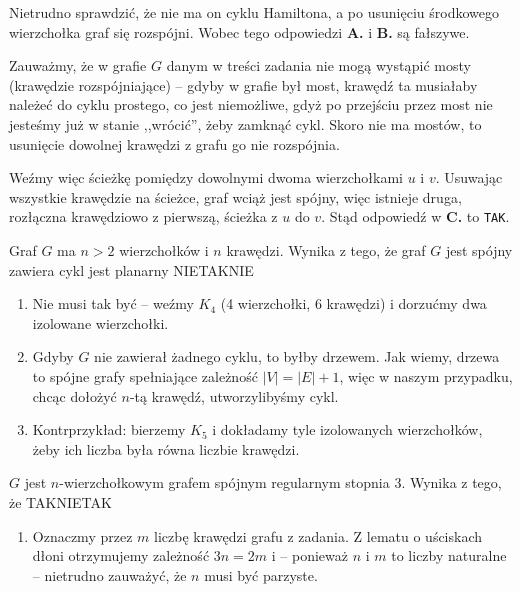 \begin{solutions}
\begin{center}
    \end{center}
    
    Nietrudno sprawdzić, że nie ma on cyklu Hamiltona, a po usunięciu środkowego wierzchołka graf się rozspójni. Wobec tego odpowiedzi \textbf{A.} i \textbf{B.} są fałszywe. 
    
    Zauważmy, że w grafie $G$ danym w treści zadania nie mogą wystąpić mosty (krawędzie rozspójniające) -- gdyby w grafie był most, krawędź ta musiałaby należeć do cyklu prostego, co jest niemożliwe, gdyż po przejściu przez most nie jesteśmy już w stanie ,,wrócić'', żeby zamknąć cykl. Skoro nie ma mostów, to usunięcie dowolnej krawędzi z grafu go nie rozspójnia.
    
    Weźmy więc ścieżkę pomiędzy dowolnymi dwoma wierzchołkami $u$ i $v$. Usuwając wszystkie krawędzie na ścieżce, graf wciąż jest spójny, więc istnieje druga, rozłączna krawędziowo z pierwszą, ścieżka z $u$ do $v$. Stąd odpowiedź w \textbf{C.} to \texttt{TAK}.

    \sol Graf $G$ ma $n > 2$ wierzchołków i $n$ krawędzi. Wynika z tego, że graf $G$
    \answerss
    {jest spójny}
    {zawiera cykl}
    {jest planarny}
    {NIE}{TAK}{NIE}
    
    \begin{enumerate}[\bf A.]
        \item Nie musi tak być -- weźmy $K_4$ (4 wierzchołki, 6 krawędzi) i dorzućmy dwa izolowane wierzchołki.
        \item Gdyby $G$ nie zawierał żadnego cyklu, to byłby drzewem. Jak wiemy, drzewa to spójne grafy spełniające zależność $|V| = |E| + 1$, więc w naszym przypadku, chcąc dołożyć $n$-tą krawędź, utworzylibyśmy cykl.
        \item Kontrprzykład: bierzemy $K_5$ i dokładamy tyle izolowanych wierzchołków, żeby ich liczba była równa liczbie krawędzi.
    \end{enumerate}

    \sol $G$ jest $n$-wierzchołkowym grafem spójnym regularnym stopnia 3. Wynika z tego, że
    {TAK}{NIE}{TAK}

    \begin{enumerate}[\bf A.]
        \item Oznaczmy przez $m$ liczbę krawędzi grafu z zadania. Z lematu o uściskach dłoni otrzymujemy zależność $3n = 2m$ i -- ponieważ $n$ i $m$ to liczby naturalne -- nietrudno zauważyć, że $n$ musi być parzyste.
        

\end{enumerate}
\end{solutions}
